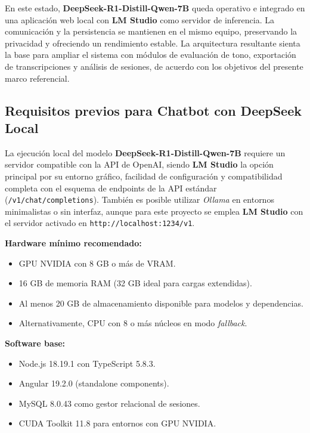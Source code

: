 \documentclass[12pt,a4paper]{report}
\numberwithin{figure}{section}
\begin{document}
\vspace{1em}
En este estado, \textbf{DeepSeek-R1-Distill-Qwen-7B} queda operativo e integrado en una aplicación web local con \textbf{LM Studio} como servidor de inferencia. La comunicación y la persistencia se mantienen en el mismo equipo, preservando la privacidad y ofreciendo un rendimiento estable. La arquitectura resultante sienta la base para ampliar el sistema con módulos de evaluación de tono, exportación de transcripciones y análisis de sesiones, de acuerdo con los objetivos del presente marco referencial.


\subsection[Requisitos para Chatbot con DeepSeek Local]{Requisitos previos para Chatbot con DeepSeek Local}
\label{subsec:req_deepseek_chatbot}

La ejecución local del modelo \textbf{DeepSeek-R1-Distill-Qwen-7B} requiere un servidor compatible con la API de OpenAI, siendo \textbf{LM Studio} la opción principal por su entorno gráfico, facilidad de configuración y compatibilidad completa con el esquema de endpoints de la API estándar (\texttt{/v1/chat/completions}).  
También es posible utilizar \textit{Ollama} en entornos minimalistas o sin interfaz, aunque para este proyecto se emplea \textbf{LM Studio} con el servidor activado en \texttt{http://localhost:1234/v1}.

\vspace{0.5em}
\noindent \textbf{Hardware mínimo recomendado:}
\begin{itemize}
  \item GPU NVIDIA con 8 GB o más de VRAM.
  \item 16 GB de memoria RAM (32 GB ideal para cargas extendidas).
  \item Al menos 20 GB de almacenamiento disponible para modelos y dependencias.
  \item Alternativamente, CPU con 8 o más núcleos en modo \textit{fallback}.
\end{itemize}

\vspace{0.5em}
\noindent \textbf{Software base:}
\begin{itemize}
  \item Node.js 18.19.1 con TypeScript 5.8.3.
  \item Angular 19.2.0 (standalone components).
  \item MySQL 8.0.43 como gestor relacional de sesiones.
  \item CUDA Toolkit 11.8 para entornos con GPU NVIDIA.
\end{itemize}
\end{document}
